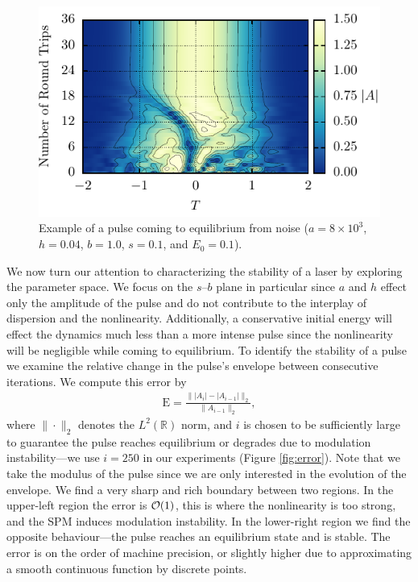 \documentclass[10pt,twocolumn,a4paper]{article}
\let\originalleft\left
\let\originalright\right
\renewcommand{\left}{\mathopen{}\mathclose\bgroup\originalleft}
\renewcommand{\right}{\aftergroup\egroup\originalright}
\providecommand{\bigO}[1]{\ensuremath{\mathop{}\mathopen{}\mathcal{O}\mathopen{}\left(#1\right)}}
\begin{document}
\begin{figure}[tbp]
	\centering
	\includegraphics{Conv}
	\caption{Example of a pulse coming to equilibrium from noise ($a = 8 \times 10^3$, $h = 0.04$, $b = 1.0$, $s = 0.1$, and $E_0 = 0.1$).}
	\label{fig:convevo}
\end{figure}

We now turn our attention to characterizing the stability of a laser by exploring the parameter space. We focus on the $s$--$b$ plane in particular since $a$ and $h$ effect only the amplitude of the pulse and do not contribute to the interplay of dispersion and the nonlinearity. Additionally, a conservative initial energy will effect the dynamics much less than a more intense pulse since the nonlinearity will be negligible while coming to equilibrium. To identify the stability of a pulse we examine the relative change in the pulse's envelope between consecutive iterations. We compute this error by
\begin{align}
	\textrm{E} = \frac{\| |A_i| - |A_{i-1}| \|_2}{\| A_{i-1} \|_2},
	\label{eq:error}
\end{align}
where $\| \cdot \|_2$ denotes the $L^2(\mathbb{R})$ norm, and $i$ is chosen to be sufficiently large to guarantee the pulse reaches equilibrium or degrades due to modulation instability---we use $i = 250$ in our experiments (Figure \ref{fig:error}). Note that we take the modulus of the pulse since we are only interested in the evolution of the envelope. We find a very sharp and rich boundary between two regions. In the upper-left region the error is $\bigO{1}$, this is where the nonlinearity is too strong, and the SPM induces modulation instability. In the lower-right region we find the opposite behaviour---the pulse reaches an equilibrium state and is stable. The error is on the order of machine precision, or slightly higher due to approximating a smooth continuous function by discrete points.
\end{document}
